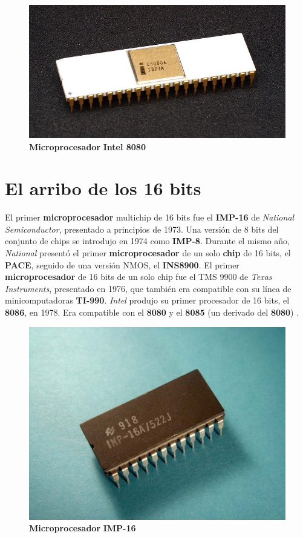 \begin{figure}[htb]
	\centering
	\includegraphics[scale = 0.2]{Graphics/8080_microprocessorr.jpg}
	\caption{\textbf{Microprocesador} \textbf{Intel 8080}}
	\label{fig:14}
\end{figure}

\section{El arribo de los 16 bits}

El primer \textbf{microprocesador} multichip de 16 bits fue el \textbf{IMP-16} de \emph{National Semiconductor}, presentado a principios de 1973. Una versión de 8 bits del conjunto de 
chips se introdujo en 1974 como \textbf{IMP-8}. Durante el mismo año, \emph{National} presentó el primer \textbf{microprocesador} de un solo \textbf{chip} de 16 bits, el \textbf{PACE},
seguido de una versión NMOS, el \textbf{INS8900}. El primer \textbf{microprocesador} de 16 bits de un solo chip fue el TMS 9900 de \emph{Texas Instruments}, presentado en 1976, que
también era compatible con su línea de minicomputadoras \textbf{TI-990}. \emph{Intel} produjo su primer procesador de 16 bits, el \textbf{8086}, en 1978. Era compatible con el \textbf{8080}
y el \textbf{8085} (un derivado del \textbf{8080}) .

\begin{figure}[htb]
	\centering
	\includegraphics[scale = 0.2]{Graphics/NSIMP-16A.jpg}
	\caption{\textbf{Microprocesador} \textbf{IMP-16}}
	\label{fig:15}
\end{figure}

